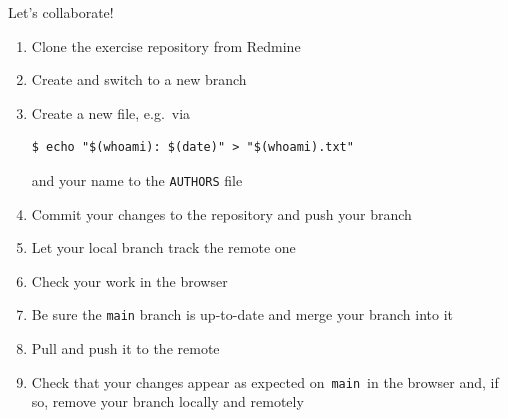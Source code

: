 \documentclass[usenames,svgnames,14pt]{beamer}
\newcommand{\then}{\raisebox{2pt}{$\;\drsh\;$}}
\begin{document}
\begin{frame}[fragile]{Let's collaborate!}
    \small
    \setlength{\leftmargini}{5mm}
    \begin{enumerate}
        \setlength{\itemsep}{-1mm}
        \item Clone the exercise repository from Redmine\\
              \then {}
        \item Create and switch to a new branch
        \item Create a new file, e.g.\ via
              \begin{lstlisting}[style=MyBash, xleftmargin=3mm, xrightmargin=28mm, belowskip=-9mm, aboveskip=2mm]
                  $ echo "$(whoami): $(date)" > "$(whoami).txt"
              \end{lstlisting}
              and your name to the \texttt{AUTHORS} file
        \item Commit your changes to the repository and push your branch
        \item Let your local branch track the remote one
        \item Check your work in the browser
        \item Be sure the \texttt{main} branch is up-to-date and merge your branch into it
        \item Pull and push it to the remote
        \item Check that your changes appear as expected on \,\texttt{main}\, in the browser and, if so, remove your branch locally and remotely
    \end{enumerate}
\end{frame}

\end{document}
